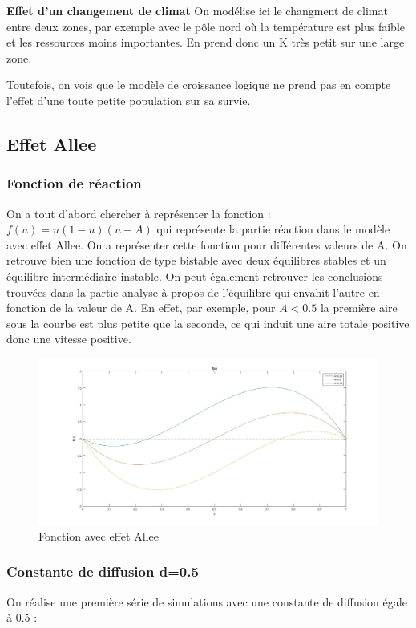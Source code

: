\documentclass[a4paper,11pt]{article}
\begin{document}
\textbf{Effet d'un changement de climat}
On modélise ici le changment de climat entre deux zones, par exemple avec le pôle nord où la température est plus faible et les ressources moins importantes. En prend donc un K très petit sur une large zone. 





Toutefois, on vois que le modèle de croissance logique ne prend pas en compte l'effet d'une toute petite population sur sa survie. 
\subsection{Effet Allee}
\subsubsection{Fonction de réaction}
On a tout d'abord chercher à représenter la fonction :$f(u)=u(1-u)(u-A)$ qui représente la partie réaction dans le modèle avec effet Allee. On a représenter cette fonction pour différentes valeurs de A. On retrouve bien une fonction de type bistable avec deux équilibres stables et un équilibre intermédiaire instable. On peut également retrouver les conclusions trouvées dans la partie analyse à propos de l'équilibre qui envahit l'autre en fonction de la valeur de A. En effet, par exemple, pour $A<0.5$ la première aire sous la courbe est plus petite que la seconde, ce  qui induit une aire totale positive donc une vitesse positive.
\noindent
\begin{figure}[H]
	\centering
	\includegraphics[width=0.9\linewidth]{Allee/fu_Allee}
	\caption{Fonction avec effet Allee}
\end{figure}

\subsubsection{Constante de diffusion d=0.5}
On réalise une première série de simulations avec une constante de diffusion égale à 0.5 :
\end{document}
